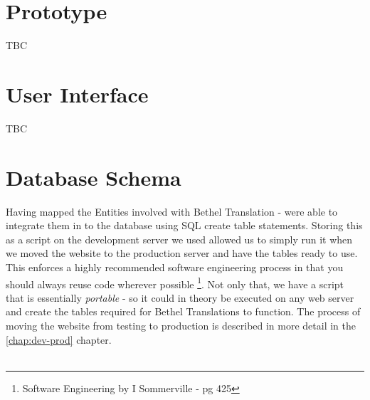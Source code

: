 \documentclass{l3proj}
\begin{document}
\section{Prototype}
\label{sect:proto}
TBC

\section{User Interface}
\label{sect:ui}
TBC

\section{Database Schema}
\label{sect:db-sch}
Having mapped the Entities involved with Bethel Translation -  were able to
integrate them in to 
the database using SQL create table statements. Storing this as a script on the
development server we used
allowed us to simply run it when we moved the website to the production server
and have the tables ready to use.
This enforces a highly recommended software engineering process in that you
should always reuse code wherever 
possible \footnote{Software Engineering by I Sommerville - pg 425}. Not only
that, we have a script that is essentially
\textit{portable} - so it could in theory be executed on any web server and
create the tables required for
Bethel Translations to function. The process of moving the website from testing
to production is described 
in more detail in the \ref{chap:dev-prod} chapter. \\
\\
\end{document}
